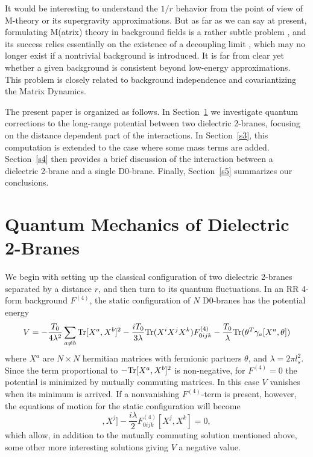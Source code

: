 \documentclass[a4paper,12pt]{article}
\begin{document}
It would be interesting to understand the $1/r$ behavior from the point of view of M-theory or its supergravity approximations. But as far as we can say at present, formulating M(atrix) theory in background fields is a rather subtle problem \cite{DOS}, and its success relies essentially on the existence of a decoupling limit \cite{BFSS}, which may no longer exist if a nontrivial background is introduced. It is far from clear yet whether a given background is consistent beyond low-energy approximations. This problem is closely related to background independence and covariantizing the Matrix Dynamics.

The present paper is organized as follows. In Section~\ref{s2} we investigate quantum corrections to the long-range potential between two dielectric 2-branes, focusing on the distance dependent part of the interactions. In Section~\ref{s3}, this computation is extended to the case where some mass terms are added. Section~\ref{s4} then provides a brief discussion of the interaction between a dielectric 2-brane and a single D0-brane. Finally, Section~\ref{s5} summarizes our conclusions.
\section{Quantum Mechanics of Dielectric 2-Branes}\label{s2}
We begin with setting up the classical configuration of two dielectric 2-branes separated by a distance $r$, and then turn to its quantum fluctuations. In an RR 4-form background $F^{(4)}$, the static configuration of $N$ D0-branes has the potential energy \cite{Myers}
\begin{equation}
V = -\frac{T_{0}}{4\lambda^{2}}\sum_{a\neq b}{\rm Tr}[X^{a},X^{b}]^{2}
-\frac{iT_{0}}{3\lambda}{\rm Tr}(X^{i}X^{j}X^{k})F^{(4)}_{0ijk}-\frac{T_{0}}{\lambda}{\rm Tr}(\theta^{T}\gamma_{a}[X^{a},\theta])
\label{energy1}
\end{equation}
where $X^{a}$ are $N\times N$ hermitian matrices with fermionic partners $\theta$, and $\lambda=2\pi l_{s}^{2}$. Since the term proportional to $-{\rm Tr}[X^{a},X^{b}]^{2}$ is non-negative, for $F^{(4)}=0$ the potential is minimized by mutually commuting matrices. In this case $V$ vanishes when its minimum is arrived. If a nonvanishing $F^{(4)}$-term is present, however, the equations of motion for the static configuration will become
\begin{equation}
[[X^{i},X^{j}],X^{j}]-\frac{i\lambda}{2}F^{(4)}_{0ijk}[X^{j},X^{k}]=0,
\label{EOM1}
\end{equation}
which allow, in addition to the mutually commuting solution mentioned above, some other more interesting solutions giving $V$ a negative value.
\end{document}
